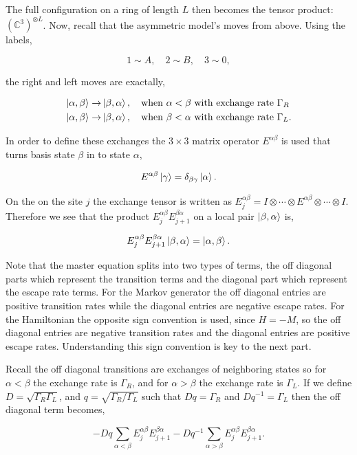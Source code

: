 \documentclass{article}
\begin{document}
The full configuration on a ring of length $L$ then becomes the tensor product: $\left(\mathbb{C}^3\right)^{\otimes L}$. Now, recall that the asymmetric model's moves from above. Using the labels,

\[1\sim A, \quad 2 \sim B, \quad 3 \sim 0,\]

the right and left moves are exactally,

\begin{align*}
\ket{\alpha,\beta} \rightarrow& \ket{\beta, \alpha}, \quad \text{when $\alpha < \beta$ with exchange rate $\Gamma_R$} \\
\ket{\alpha,\beta}\rightarrow& \ket{\beta,\alpha}, \quad \text{when $\beta< \alpha$ with exchange rate $\Gamma_L$.}
\end{align*}

In order to define these exchanges the $3\times3$ matrix operator $E^{\alpha\beta}$ is used that turns basis state $\beta$ in to state $\alpha$, 

\[E^{\alpha\beta}\ket{\gamma} = \delta_{\beta\gamma}\ket{\alpha}.\]

On the on the site $j$ the exchange tensor is written as $E_{j}^{\alpha\beta} = I\otimes\cdots\otimes E^{\alpha\beta} \otimes\cdots\otimes I$. Therefore we see that the product $E^{\alpha\beta}_j E^{\beta\alpha}_{j+1}$ on a local pair $\ket{\beta,\alpha}$ is,

\[E_{j}^{\alpha\beta} E_{j+1}^{\beta\alpha} \ket{\beta,\alpha} = \ket{\alpha,\beta}.\]

Note that the master equation splits into two types of terms, the off diagonal parts which represent the transition terms and the diagonal part which represent the escape rate terms. For the Markov generator the off diagonal entries are positive transition rates while the diagonal entries are negative escape rates. For the Hamiltonian the opposite sign convention is used, since $H=-M$, so the off diagonal entries are negative transition rates and the diagonal entries are positive escape rates. Understanding this sign convention is key to the next part. 

Recall the off diagonal transitions are exchanges of neighboring states so for $\alpha<\beta$ the exchange rate is $\Gamma_R$, and for $\alpha>\beta$ the exchange rate is $\Gamma_L$. If we define $D=\sqrt{\Gamma_R\Gamma_L}$, and $q=\sqrt{\Gamma_R/\Gamma_L}$ such that $Dq = \Gamma_R$ and $Dq^{-1}=\Gamma_L$ then the off diagonal term becomes,

\[-Dq\sum_{\alpha<\beta} E^{\alpha\beta}_j E^{\beta\alpha}_{j+1} - Dq^{-1}\sum_{\alpha>\beta} E^{\alpha\beta}_j E^{\beta\alpha}_{j+1}.\]
\end{document}
